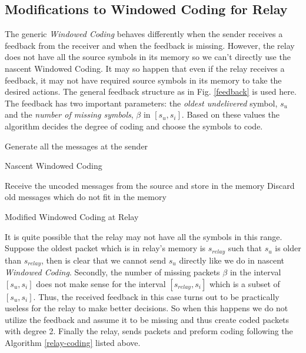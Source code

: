 \subsection{Modifications to Windowed Coding for Relay}

The generic \textit{Windowed Coding} behaves differently when the sender receives a feedback from the receiver and when the feedback is missing. However, the relay does not have all the source symbols in its memory so we can't directly use the nascent Windowed Coding. It may so happen that even if the relay receives a feedback, it may not have required source symbols in its memory to take the desired actions. The general feedback structure as in Fig. \ref{feedback} is used here. The feedback has two important parameters: the \textit{oldest undelivered} symbol, $s_u$ and the \textit{number of missing symbols}, $\beta$ in $[s_u, s_i]$. Based on these values the algorithm decides the degree of coding and choose the symbols to code.

\begin{algorithm}[H]
	\label{window}
	\SetAlgoLined
	Generate all the messages at the sender\;
	\caption{Nascent Windowed Coding}
\end{algorithm}


 \begin{algorithm}[H]
 	\label{relay-coding}
 	\SetAlgoLined
 	Receive the uncoded messages from the source and store in the memory\;
 	Discard old messages which do not fit in the memory\;
 	\caption{Modified Windowed Coding at Relay}
 \end{algorithm}

 It is quite possible that the relay may not have all the symbols in this range. Suppose the oldest packet which is in relay's memory is $s_{relay}$ such that $s_u$ is older than $s_{relay}$, then is clear that we cannot send $s_u$ directly like we do in nascent \textit{Windowed Coding}. Secondly, the number of missing packets $\beta$ in the interval $[s_u, s_i]$ does not make sense for the interval $[s_{relay}, s_i]$ which is a subset of $[s_u, s_i]$. Thus, the received feedback in this case turns out to be practically useless for the relay to make better decisions. So when this happens we do not utilize the feedback and assume it to be missing and thus create coded packets with degree 2. Finally the relay, sends packets and preform coding following the Algorithm \ref{relay-coding} listed above.
 
